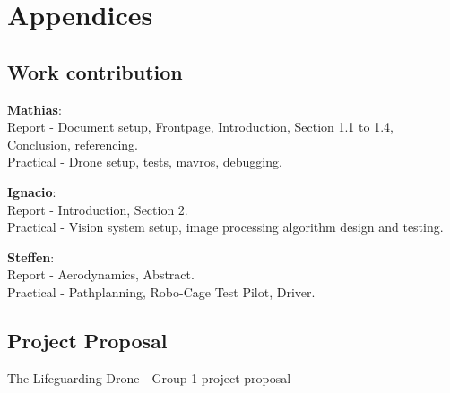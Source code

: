 \part*{Appendices}
\appendix
\chapter{Work contribution}
\label{app:work}
\textbf{Mathias}:\\
Report - Document setup, Frontpage,  Introduction, Section  1.1 to 1.4, Conclusion, referencing.\\
Practical - Drone setup, tests, mavros, debugging.

\textbf{Ignacio}:\\
Report - Introduction, Section  2.\\
Practical - Vision system setup, image processing algorithm design and testing.

\textbf{Steffen}:\\
Report - Aerodynamics, Abstract.\\
Practical - Pathplanning, 
Robo-Cage Test Pilot, Driver.

\newpage

\chapter{Project Proposal}
\label{app:projectproposal}
The Lifeguarding Drone - Group 1 project proposal\\

